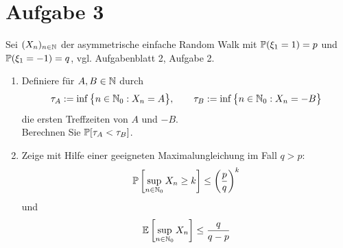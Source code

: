\documentclass[12pt,a4paper]{article}
\begin{document}
\section*{Aufgabe 3}
Sei $(X_n)_{n\in\N}$ der asymmetrische einfache Random Walk mit $\P(\xi_1=1)=p$ und $\P(\xi_1=-1)=q$, vgl. Aufgabenblatt 2, Aufgabe 2.
\begin{enumerate}[label=\alph*)]
\item Definiere für $A,B\in\N$ durch
\begin{align*}
\tau_A:=\inf\big\lbrace n\in\N_0:X_n=A\big\rbrace,\qquad \tau_B:=\inf\limits\big\lbrace n\in\N_0:X_n=-B\big\rbrace
\end{align*}
die ersten Treffzeiten von $A$ und $-B$.\\
Berechnen Sie $\P[\tau_A<\tau_B]$.
\item Zeige mit Hilfe einer geeigneten Maximalungleichung im Fall $q>p$:
\begin{align}\label{eqAufgabe3bObere}
\P\left[\sup\limits_{n\in\N_0} X_n\geq k\right]\leq\left(\frac{p}{q}\right)^k
\end{align}
und 
\begin{align}\label{eqAufgabe3bUntere}
\E\left[\sup\limits_{n\in\N_0} X_n\right]\leq\frac{q}{q-p}
\end{align}
\end{enumerate}
\end{document}
